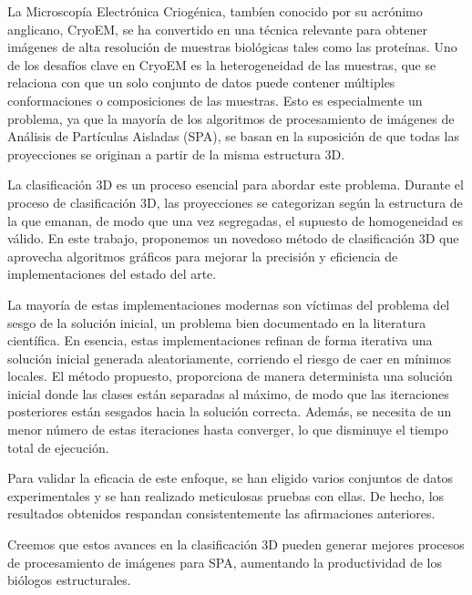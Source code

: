 \documentclass[../main.tex]{subfiles}
\begin{document}
La Microscopía Electrónica Criogénica, tambíen conocido por su acrónimo anglicano, CryoEM, se ha convertido en una técnica relevante para obtener imágenes de alta resolución de muestras biológicas tales como las proteínas. Uno de los desafíos clave en CryoEM es la heterogeneidad de las muestras, que se relaciona con que un solo conjunto de datos puede contener múltiples conformaciones o composiciones de las muestras. Esto es especialmente un problema, ya que la mayoría de los algoritmos de procesamiento de imágenes de Análisis de Partículas Aisladas (SPA), se basan en la suposición de que todas las proyecciones se originan a partir de la misma estructura 3D.

La clasificación 3D es un proceso esencial para abordar este problema. Durante el proceso de clasificación 3D, las proyecciones se categorizan según la estructura de la que emanan, de modo que una vez segregadas, el supuesto de homogeneidad es válido. En este trabajo, proponemos un novedoso método de clasificación 3D que aprovecha algoritmos gráficos para mejorar la precisión y eficiencia de implementaciones del estado del arte.

La mayoría de estas implementaciones modernas son víctimas del problema del sesgo de la solución inicial, un problema bien documentado en la literatura científica. En esencia, estas implementaciones refinan de forma iterativa una solución inicial generada aleatoriamente, corriendo el riesgo de caer en mínimos locales. El método propuesto, proporciona de manera determinista una solución inicial donde las clases están separadas al máximo, de modo que las iteraciones posteriores están sesgados hacia la solución correcta. Además, se necesita de un menor número de estas iteraciones hasta converger, lo que disminuye el tiempo total de ejecución.

Para validar la eficacia de este enfoque, se han eligido varios conjuntos de datos experimentales y se han realizado meticulosas pruebas con ellas. De hecho, los resultados obtenidos respandan consistentemente las afirmaciones anteriores.

Creemos que estos avances en la clasificación 3D pueden generar mejores procesos de procesamiento de imágenes para SPA, aumentando la productividad de los biólogos estructurales.
\end{document}
